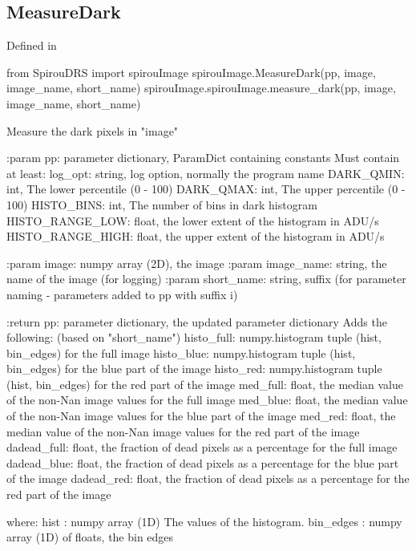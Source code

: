 \noindent\begin{minipage}{\textwidth}
\subsection{MeasureDark}

Defined in \spirouImage{}

\begin{pythonbox}
from SpirouDRS import spirouImage
spirouImage.MeasureDark(pp, image, image_name, short_name)
spirouImage.spirouImage.measure_dark(pp, image, image_name, short_name)
\end{pythonbox}

\begin{pythondocstring}
Measure the dark pixels in "image"

:param pp: parameter dictionary, ParamDict containing constants
    Must contain at least:
            log_opt: string, log option, normally the program name
            DARK_QMIN: int, The lower percentile (0 - 100)
            DARK_QMAX: int, The upper percentile (0 - 100)
            HISTO_BINS: int,  The number of bins in dark histogram
            HISTO_RANGE_LOW: float, the lower extent of the histogram
                             in ADU/s
            HISTO_RANGE_HIGH: float, the upper extent of the histogram
                              in ADU/s

:param image: numpy array (2D), the image
:param image_name: string, the name of the image (for logging)
:param short_name: string, suffix (for parameter naming -
                    parameters added to pp with suffix i)

:return pp: parameter dictionary, the updated parameter dictionary
        Adds the following: (based on "short_name")
            histo_full: numpy.histogram tuple (hist, bin_edges) for
                        the full image
            histo_blue: numpy.histogram tuple (hist, bin_edges) for
                        the blue part of the image
            histo_red: numpy.histogram tuple (hist, bin_edges) for
                        the red part of the image
            med_full: float, the median value of the non-Nan image values
                      for the full image
            med_blue: float, the median value of the non-Nan image values
                      for the blue part of the image
            med_red: float, the median value of the non-Nan image values
                     for the red part of the image
            dadead_full: float, the fraction of dead pixels as a percentage
                         for the full image
            dadead_blue: float, the fraction of dead pixels as a percentage
                         for the blue part of the image
            dadead_red: float, the fraction of dead pixels as a percentage
                        for the red part of the image

      where:
          hist : numpy array (1D) The values of the histogram.
          bin_edges : numpy array (1D) of floats, the bin edges
\end{pythondocstring}
\end{minipage}


